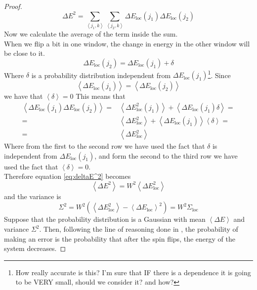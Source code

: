 \documentclass{article}
\theoremstyle{definition}
\theoremstyle{remark}
\newcommand{\avg}[1]{\left \langle #1 \right \rangle}
\begin{document}
\begin{proof}
\begin{equation}
            \Delta E^2=\sum_{\avg{j_1,k}}\sum_{\avg{j_2,k}}\Delta E_\textrm{loc}(j_1)\Delta E_\textrm{loc}(j_2)
        \end{equation}
        Now we calculate the average of the term inside the sum.\\
        When we flip a bit in one window, the change in energy in the other window will be close to it. 
        \begin{equation}
            \Delta E_\textrm{loc}(j_2)=\Delta E_\textrm{loc}(j_1) + \delta
        \end{equation}
        Where $\delta$ is a probability distribution independent from $\Delta E_\textrm{loc}(j_1)$\footnote{How really accurate is this? I'm sure that IF there is a dependence it is going to be VERY small, should we consider it? and how?}.
        Since 
        \[
            \avg{\Delta E_\textrm{loc}(j_1)}=\avg{\Delta E_\textrm{loc}(j_2)}
        \]
        we have that $\avg \delta=0$
        This means that
        \begin{equation}
        \begin{split} 
            \avg{\Delta E_\textrm{loc}(j_1)\Delta E_\textrm{loc}(j_2)}=&\avg{\Delta E_\textrm{loc}^2(j_1)} + \avg{\Delta E_\textrm{loc}(j_1)\delta}=\\
            =&\avg{\Delta E_\textrm{loc}^2}+\avg{\Delta E_\textrm{loc}(j_1)}\avg{\delta}=\\
            =&\avg{\Delta E^2_\textrm{loc}}
        \end{split}
        \end{equation}
        Where from the first to the second row we have used the fact that $\delta$ is independent from $\Delta E_\textrm{loc}(j_1)$, and form the second to the third row we have used the fact that $\avg \delta=0$.\\
        Therefore equation \ref{eq:deltaE^2} becomes
        \begin{equation}
            \avg{\Delta E^2}=W^2\avg{\Delta E^2_\textrm{loc}}
        \end{equation}
        and the variance is
        \begin{equation}
            \Sigma^2=W^2\left(\avg{\Delta E^2_\textrm{loc}} - \avg{\Delta E_\textrm{loc}}^2\right)=W^2\Sigma_\textrm{loc}
        \end{equation}
        Suppose that the probability distribution is a Gaussian with mean $\avg{\Delta E}$ and variance $\Sigma^2$. Then, following the line of reasoning done in \cite{krotov2016dense}, the probability of making an error is the probability  that after the spin flips, the energy of the system decreases.

\end{proof}
\end{document}
